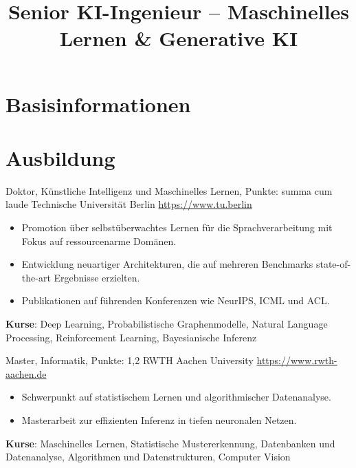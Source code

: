 \documentclass[a4paper, serif, 10pt]{moderncv}
\title{Senior KI-Ingenieur – Maschinelles Lernen \& Generative KI}
\begin{document}
\maketitle

\section{Basisinformationen}

\section{Ausbildung}

        {Doktor, Künstliche Intelligenz und Maschinelles Lernen, Punkte: summa cum laude}
        {Technische Universität Berlin}
        {\url{https://www.tu.berlin}}
        {}
        {\begin{itemize}
\item Promotion über selbstüberwachtes Lernen für die Sprachverarbeitung mit Fokus auf ressourcenarme Domänen.
\item Entwicklung neuartiger Architekturen, die auf mehreren Benchmarks state-of-the-art Ergebnisse erzielten.
\item Publikationen auf führenden Konferenzen wie NeurIPS, ICML und ACL.
\end{itemize}
\textbf{Kurse}: Deep Learning, Probabilistische Graphenmodelle, Natural Language Processing, Reinforcement Learning, Bayesianische Inferenz}

        {Master, Informatik, Punkte: 1,2}
        {RWTH Aachen University}
        {\url{https://www.rwth-aachen.de}}
        {}
        {\begin{itemize}
\item Schwerpunkt auf statistischem Lernen und algorithmischer Datenanalyse.
\item Masterarbeit zur effizienten Inferenz in tiefen neuronalen Netzen.
\end{itemize}
\textbf{Kurse}: Maschinelles Lernen, Statistische Mustererkennung, Datenbanken und Datenanalyse, Algorithmen und Datenstrukturen, Computer Vision}
\end{document}
